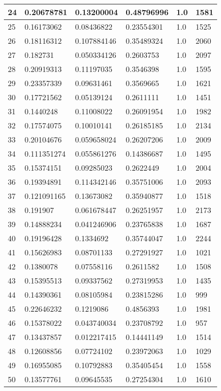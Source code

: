 \begin{longtable}{|l|l|l|l|l|l|}
24 & 0.20678781 & 0.13200004 & 0.48796996 & 1.0 & 1581 \\ \hline 
25 & 0.16173062 & 0.08436822 & 0.23554301 & 1.0 & 1525 \\ \hline 
26 & 0.18116312 & 0.107884146 & 0.35489324 & 1.0 & 2060 \\ \hline 
27 & 0.182731 & 0.050334126 & 0.2603753 & 1.0 & 2097 \\ \hline 
28 & 0.20919313 & 0.11197035 & 0.3546398 & 1.0 & 1595 \\ \hline 
29 & 0.23357339 & 0.09631461 & 0.3569665 & 1.0 & 1621 \\ \hline 
30 & 0.17721562 & 0.05139124 & 0.2611111 & 1.0 & 1451 \\ \hline 
31 & 0.1440248 & 0.11008022 & 0.26091954 & 1.0 & 1982 \\ \hline 
32 & 0.17574075 & 0.10010141 & 0.26185185 & 1.0 & 2134 \\ \hline 
33 & 0.20104676 & 0.059658024 & 0.26207206 & 1.0 & 2009 \\ \hline 
34 & 0.111351274 & 0.055861276 & 0.14386687 & 1.0 & 1495 \\ \hline 
35 & 0.15374151 & 0.09285023 & 0.2622449 & 1.0 & 2004 \\ \hline 
36 & 0.19394891 & 0.114342146 & 0.35751006 & 1.0 & 2093 \\ \hline 
37 & 0.121091165 & 0.13673082 & 0.35940877 & 1.0 & 1518 \\ \hline 
38 & 0.191907 & 0.061678447 & 0.26251957 & 1.0 & 2173 \\ \hline 
39 & 0.14888234 & 0.041246906 & 0.23765838 & 1.0 & 1687 \\ \hline 
40 & 0.19196428 & 0.1334692 & 0.35744047 & 1.0 & 2244 \\ \hline 
41 & 0.15626983 & 0.08701133 & 0.27291927 & 1.0 & 1021 \\ \hline 
42 & 0.1380078 & 0.07558116 & 0.2611582 & 1.0 & 1508 \\ \hline 
43 & 0.15395513 & 0.09337562 & 0.27319953 & 1.0 & 1435 \\ \hline 
44 & 0.14390361 & 0.08105984 & 0.23815286 & 1.0 & 999 \\ \hline 
45 & 0.22646232 & 0.1219086 & 0.4856393 & 1.0 & 1981 \\ \hline 
46 & 0.15378022 & 0.043740034 & 0.23708792 & 1.0 & 957 \\ \hline 
47 & 0.13437857 & 0.012217415 & 0.14441149 & 1.0 & 1514 \\ \hline 
48 & 0.12608856 & 0.07724102 & 0.23972063 & 1.0 & 1029 \\ \hline 
49 & 0.16955085 & 0.10792883 & 0.35405454 & 1.0 & 1558 \\ \hline 
50 & 0.13577761 & 0.09645535 & 0.27254304 & 1.0 & 1610 \\ \hline 
\end{longtable}